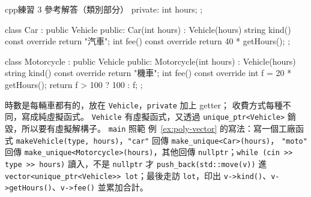 \begin{enumerate}
\begin{code}{cpp}{練習 3 參考解答（類別部分）}
{private:
    int hours;
};

class Car : public Vehicle {
public:
    Car(int hours) : Vehicle(hours) {}
    string kind() const override { return "汽車"; }
    int fee() const override { return 40 * getHours(); }
};

class Motorcycle : public Vehicle {
public:
    Motorcycle(int hours) : Vehicle(hours) {}
    string kind() const override { return "機車"; }
    int fee() const override {
        int f = 20 * getHours();
        return f > 100 ? 100 : f;
    }
};
\end{code}
時數是每輛車都有的，放在 \texttt{Vehicle}，\texttt{private} 加上 getter；
收費方式每種不同，寫成純虛擬函式。 \texttt{Vehicle} 有虛擬函式，又透過
\texttt{unique\_ptr<Vehicle>} 銷毀，所以要有虛擬解構子。 \texttt{main} 照範
例~\ref{ex:poly-vector} 的寫法：寫一個工廠函式 \texttt{makeVehicle(type,
hours)}，\texttt{"car"} 回傳 \texttt{make\_unique<Car>(hours)}，
\texttt{"moto"} 回傳 \texttt{make\_unique<Motorcycle>(hours)}，其他回傳
\texttt{nullptr}；\texttt{while (cin >> type >> hours)} 讀入，不是
\texttt{nullptr} 才 \texttt{push\_back(std::move(v))} 進
\texttt{vector<unique\_ptr<Vehicle>> lot}；最後走訪 \texttt{lot}，印出
\texttt{v->kind()}、\texttt{v->getHours()}、\texttt{v->fee()} 並累加合計。


\end{enumerate}
